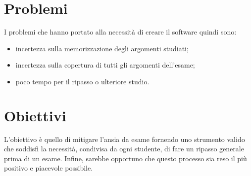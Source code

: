 \section{Problemi}
I problemi che hanno portato alla necessità di creare il software quindi sono: 
    \begin{itemize}
        \item incertezza sulla memorizzazione degli argomenti studiati;
        \item incertezza sulla copertura di tutti gli argomenti dell'esame;
        \item poco tempo per il ripasso o ulteriore studio.
    \end{itemize}
 

\section{Obiettivi}
L'obiettivo è quello di mitigare l'ansia da esame fornendo uno strumento valido che soddisfi la necessità, condivisa da ogni studente, di fare un ripasso generale prima di un esame.
Infine, sarebbe opportuno che questo processo sia reso il più positivo e piacevole possibile.

